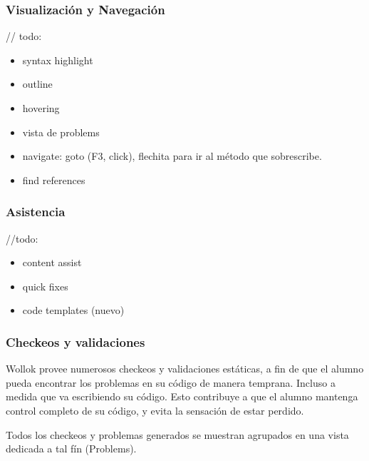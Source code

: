 \subsubsection{Visualización y Navegación}

// todo: 
\begin{itemize}
  \item syntax highlight
  \item outline
  \item hovering
  \item vista de problems 
  \item navigate: goto (F3, click), flechita para ir al método que sobrescribe.
  \item find references 
\end{itemize}

\subsubsection{Asistencia}

//todo: 
\begin{itemize}
  \item content assist
  \item quick fixes
  \item code templates (nuevo)
\end{itemize}

\subsubsection{Checkeos y validaciones}

Wollok provee numerosos checkeos y validaciones estáticas, a fin de que el
alumno pueda encontrar los problemas en su código de manera temprana.
Incluso a medida que va escribiendo su código.
Esto contribuye a que el alumno mantenga control completo de su
código, y evita la sensación de estar perdido.
 
Todos los checkeos y problemas
generados se muestran agrupados en una vista dedicada a tal fín (Problems).

